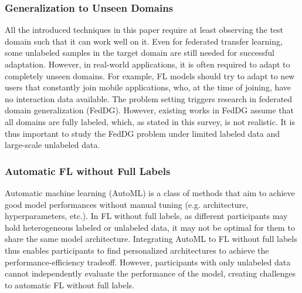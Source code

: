 \documentclass[11pt]{article}
\begin{document}
\subsubsection{Generalization to Unseen Domains}
All the introduced techniques in this paper require at least observing the test domain such that it can work well on it. Even for federated transfer learning, some unlabeled samples in the target domain are still needed for successful adaptation. However, in real-world applications, it is often required to adapt to completely unseen domains. For example, FL models should try to adapt to new users that constantly join mobile applications, who, at the time of joining, have no interaction data available. The problem setting triggers research in federated domain generalization (FedDG). However, existing works in FedDG \cite{Yilun-liu2021feddg,Yilun-nguyen2022fedsr} assume that all domains are fully labeled, which, as stated in this survey, is not realistic. It is thus important to study the FedDG problem under limited labeled data and large-scale unlabeled data.

\subsubsection{Automatic FL without Full Labels}
Automatic machine learning (AutoML) \cite{Yilun-he2021automl} is a class of methods that aim to achieve good model performances without manual tuning (e.g. architecture, hyperparameters, etc.). In FL without full labels, as different participants may hold heterogeneous labeled or unlabeled data, it may not be optimal for them to share the same model architecture. Integrating AutoML to FL without full labels thus enables participants to find personalized architectures to achieve the performance-efficiency tradeoff. However, participants with only unlabeled data cannot independently evaluate the performance of the model, creating challenges to automatic FL without full labels.
\end{document}
